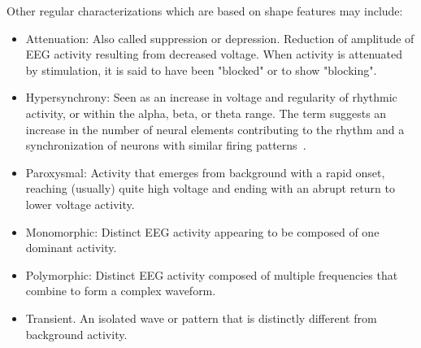 Other regular characterizations which are based on shape features may include:

\begin{itemize}
\item Attenuation: Also called suppression or depression. Reduction of amplitude of EEG activity resulting from decreased voltage. When activity is attenuated by stimulation, it is said to have been "blocked" or to show "blocking".
\item Hypersynchrony: Seen as an increase in voltage and regularity of rhythmic activity, or within the alpha, beta, or theta range. The term suggests an increase in the number of neural elements contributing to the rhythm and a synchronization of neurons with similar firing patterns~\cite{Buzsaki2012}.
\item Paroxysmal: Activity that emerges from background with a rapid onset, reaching (usually) quite high voltage and ending with an abrupt return to lower voltage activity. 
\end{itemize}

\begin{itemize}
\item Monomorphic: Distinct EEG activity appearing to be composed of one dominant activity.
\item Polymorphic: Distinct EEG activity composed of multiple frequencies that combine to form a complex waveform.
\item Transient. An isolated wave or pattern that is distinctly different from background activity.
\end{itemize}



